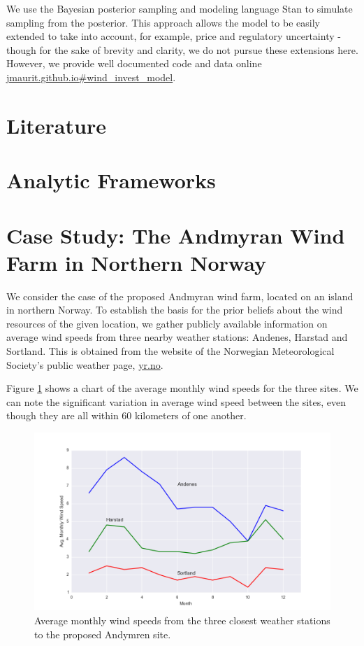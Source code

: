 \documentclass[11pt]{article}
\begin{document}
We use the Bayesian posterior sampling and modeling language Stan \citep{stan_development_team_stan} to simulate sampling from the posterior. This approach allows the model to be easily extended to take into account, for example, price and regulatory uncertainty - though for the sake of brevity and clarity, we do not pursue these extensions here. However, we provide well documented code and data online \url{jmaurit.github.io#wind_invest_model}.

\section{Literature}


\section{Analytic Frameworks}


\section{Case Study: The Andmyran Wind Farm in Northern Norway}

We consider the case of the proposed Andmyran wind farm, located on an island in northern Norway. To establish the basis for the prior beliefs about the wind resources of the given location, we gather publicly available information on average wind speeds from three nearby weather stations: Andenes, Harstad and Sortland. This is obtained from the website of the Norwegian Meteorological Society's public weather page, \url{yr.no}. 

Figure \ref{avg_wind_speed_data} shows a chart of the average monthly wind speeds for the three sites. We can note the significant variation in average wind speed between the sites, even though they are all within 60 kilometers of one another. 

\begin{figure}
	\includegraphics[width=1\textwidth]{figures/avg_wind_speed_data.png}
	\caption{Average monthly wind speeds from the three closest weather stations to the proposed Andymren site.}
	\label{avg_wind_speed_data}
\end{figure}
\end{document}
